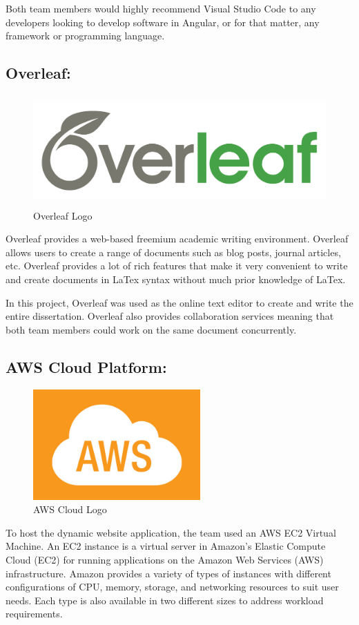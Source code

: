 Both team members would highly recommend Visual Studio Code to any developers looking to develop software in Angular, or for that matter, any framework or programming language. 

\subsection{Overleaf:}
\label{sec:TechnologyReviewOverleaf}
\begin{figure}[H]
    \centering
    \includegraphics[width=\textwidth, height=120pt]{img/overleafLogo.png}
    \caption{Overleaf Logo}
    \label{fig:my_label}
\end{figure}

Overleaf provides a web-based freemium academic writing environment. Overleaf allows users to create a range of documents such as blog posts, journal articles, etc. Overleaf provides a lot of rich features that make it very convenient to write and create documents in LaTex syntax without much prior knowledge of LaTex.

\bigskip

In this project, Overleaf was used as the online text editor to create and write the entire dissertation. Overleaf also provides collaboration services meaning that both team members could work on the same document concurrently.


\subsection{AWS Cloud Platform:}
\label{sec:TechnologyReviewAWS}

\begin{figure}[H]
    \centering
    \includegraphics[width=\textwidth, height=120pt]{img/awsLogo.PNG}
    \caption{AWS Cloud Logo}
    \label{fig:my_label}
\end{figure}
To host the dynamic website application, the team used an AWS EC2 Virtual Machine. An EC2 instance is a virtual server in Amazon’s Elastic Compute Cloud (EC2) for running applications on the Amazon Web Services (AWS) infrastructure. Amazon provides a variety of types of instances with different configurations of CPU, memory, storage, and networking resources to suit user needs. Each type is also available in two different sizes to address workload requirements.

